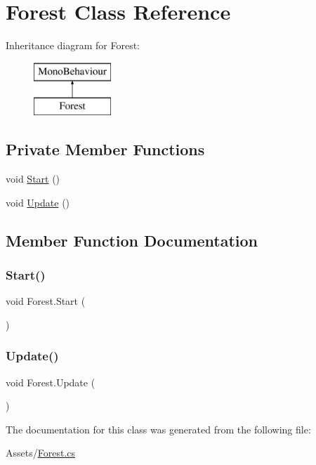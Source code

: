 \hypertarget{class_forest}{}\section{Forest Class Reference}
\label{class_forest}
Inheritance diagram for Forest\+:\begin{figure}[H]
\begin{center}
\leavevmode
\includegraphics[height=2.000000cm]{class_forest}
\end{center}
\end{figure}
\subsection*{Private Member Functions}
\begin{DoxyCompactItemize}
\item 
void \hyperlink{class_forest_a25458c04d7b7e9c8920afc789434662e}{Start} ()
\item 
void \hyperlink{class_forest_a62b569afc7e204e1cb3015256060fb0d}{Update} ()
\end{DoxyCompactItemize}


\subsection{Member Function Documentation}
\mbox{\label{class_forest_a25458c04d7b7e9c8920afc789434662e}} 
\subsubsection{\texorpdfstring{Start()}{Start()}}
{\footnotesize\ttfamily void Forest.\+Start (\begin{DoxyParamCaption}{ }\end{DoxyParamCaption})\hspace{0.3cm}{\ttfamily [private]}}

\mbox{\label{class_forest_a62b569afc7e204e1cb3015256060fb0d}} 
\subsubsection{\texorpdfstring{Update()}{Update()}}
{\footnotesize\ttfamily void Forest.\+Update (\begin{DoxyParamCaption}{ }\end{DoxyParamCaption})\hspace{0.3cm}{\ttfamily [private]}}



The documentation for this class was generated from the following file\+:\begin{DoxyCompactItemize}
\item 
Assets/\hyperlink{_forest_8cs}{Forest.\+cs}\end{DoxyCompactItemize}
